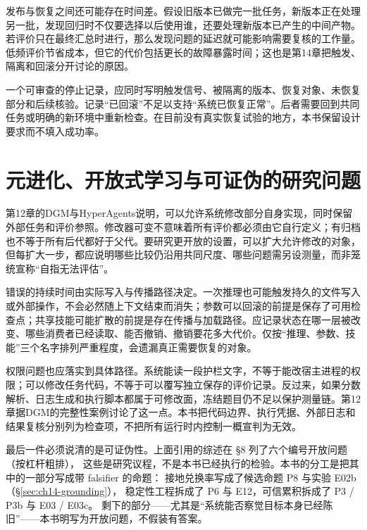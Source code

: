 发布与恢复之间还可能存在时间差。假设旧版本已做完一批任务，新版本正在处理另一批，发现回归时不仅要选择以后使用谁，还要处理新版本已产生的中间产物。若评价只在最终汇总时进行，那么发现问题的延迟就可能影响需要复核的工作量。低频评价节省成本，但它的代价包括更长的故障暴露时间；这也是第14章把触发、隔离和回滚分开讨论的原因。

一个可审查的停止记录，应同时写明触发信号、被隔离的版本、恢复对象、未恢复部分和后续核验。记录“已回滚”不足以支持“系统已恢复正常”。后者需要回到共同任务或明确的新环境中重新检查。在目前没有真实恢复试验的地方，本书保留设计要求而不填入成功率。

\section{元进化、开放式学习与可证伪的研究问题}
\label{sec:ch16-meta}

\begin{sloppypar}
第12章的DGM与HyperAgents说明，可以允许系统修改部分自身实现，同时保留外部任务和评价参照\cite{dgm-2505,hyperagents-2603}。修改器可变不意味着所有评价都必须由它自行定义；有归档也不等于所有后代都好于父代。要研究更开放的设置，可以扩大允许修改的对象，但每扩大一步，都应说明哪些比较仍沿用共同尺度、哪些问题需另设测量，而非笼统宣称“自指无法评估”。

\end{sloppypar}

\begin{sloppypar}
错误的持续时间由实际写入与传播路径决定。一次推理也可能触发持久的文件写入或外部操作，不会必然随上下文结束而消失；参数可以回滚的前提是保存了可用检查点；共享技能可能扩散的前提是存在传播与加载路径。应记录状态在哪一层被改变、哪些消费者已经读取、能否撤销、撤销要花多大代价。仅按“推理、参数、技能”三个名字排列严重程度，会遗漏真正需要恢复的对象。

\end{sloppypar}

\begin{sloppypar}
权限问题也应落实到具体路径。系统能读一段护栏文字，不等于能改宿主进程的权限；可以修改任务代码，不等于可以覆写独立保存的评价记录。反过来，如果分数解析、日志生成和执行脚本都属于可修改面，冻结题目仍不足以保护测量链。第12章据DGM的完整性案例讨论了这一点\cite{dgm-2505}。本书把代码边界、执行凭据、外部日志和结果复核分别列为检查项，不把所有运行时内控制一概宣判为无效。

\end{sloppypar}

\begin{sloppypar}
最后一件必须说清的是可证伪性。上面引用的综述在 §8 列了六个编号开放问题（按杠杆粗排），
这些是研究议程，不是本书已经执行的检验。本书的分工是把其中的一部分写成带 falsifier 的命题：
接地兑换率写成了候选命题 P8 与实验 E02b（\S\ref{sec:ch14-grounding}），
稳定性工程拆成了 P6 与 E12，可信累积拆成了 P3 / P3b 与 E03 / E03c。
剩下的部分——尤其是“系统能否察觉目标本身已经陈旧”——本书明写为开放问题，不假装有答案。
\end{sloppypar}

